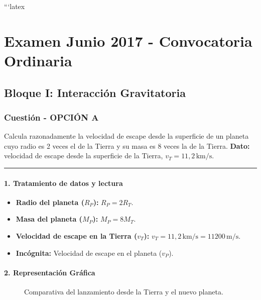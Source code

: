 ```latex
\chapter{Examen Junio 2017 - Convocatoria Ordinaria}
\label{chap:2017_jun_ord}

\section{Bloque I: Interacción Gravitatoria}
\label{sec:grav_2017_jun_ord}

\subsection{Cuestión - OPCIÓN A}
\label{subsec:B1A_2017_jun_ord}

\begin{cajaenunciado}
Calcula razonadamente la velocidad de escape desde la superficie de un planeta cuyo radio es 2 veces el de la Tierra y su masa es 8 veces la de la Tierra.
\textbf{Dato:} velocidad de escape desde la superficie de la Tierra, $v_T=11,2\,\text{km/s}$.
\end{cajaenunciado}
\hrule

\subsubsection*{1. Tratamiento de datos y lectura}
\begin{itemize}
    \item \textbf{Radio del planeta ($R_P$):} $R_P = 2 R_T$.
    \item \textbf{Masa del planeta ($M_P$):} $M_P = 8 M_T$.
    \item \textbf{Velocidad de escape en la Tierra ($v_T$):} $v_T = 11,2\,\text{km/s} = 11200\,\text{m/s}$.
    \item \textbf{Incógnita:} Velocidad de escape en el planeta ($v_P$).
\end{itemize}

\subsubsection*{2. Representación Gráfica}
\begin{figure}[H]
    \centering
    \caption{Comparativa del lanzamiento desde la Tierra y el nuevo planeta.}
\end{figure}

